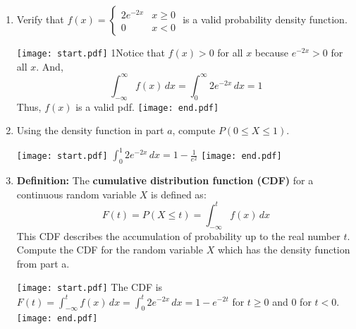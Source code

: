 \documentclass[12pt]{article}
\begin{document}
\begin{enumerate}
\begin{enumerate}
\item Verify that $f(x)=\left\{\begin{array}{ll}
2e^{-2x} & x \geq 0\\
0 & x <0
\end{array}\right.$ is a valid probability density function.

\texttt{[image: start.pdf]}
{{{1\linewidth}{Notice that $f(x) > 0$ for all $x$ because $e^{-2x}>0$ for all $x$.  And, $$\int_{-\infty}^{\infty}f(x) \,dx=\int_0^{\infty}2e^{-2x} \,dx =1$$  Thus, $f(x)$ is a valid pdf.}}}
\texttt{[image: end.pdf]}


\item Using the density function in part $a$, compute $P(0 \leq X \leq 1)$.

\texttt{[image: start.pdf]}
{{$\int_0^{1}2e^{-2x} \,dx=1-\frac{1}{e^2}$}}
\texttt{[image: end.pdf]}


\item {\bf Definition:} The {\bf cumulative distribution function (CDF)} for a continuous random variable $X$ is defined as: $$F(t)=P(X \leq t)=\int_{-\infty}^t f(x) \,dx$$  This CDF describes the accumulation of probability up to the real number $t$.  Compute the CDF for the random variable $X$ which has the density function from part a.

\texttt{[image: start.pdf]}
{{The CDF is $F(t)=\int_{-\infty}^{t}f(x) \,dx=\int_{0}^{t}2e^{-2x} \,dx=1-e^{-2t}$ for $t \geq 0$ and 0 for $t<0$.}}
\texttt{[image: end.pdf]}


\end{enumerate}

\end{enumerate}
\end{document}

